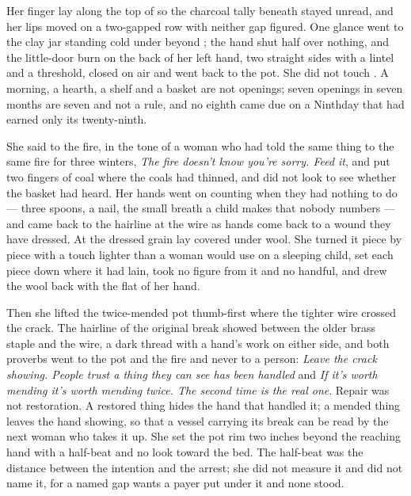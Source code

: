 Her finger lay along the top of  so the charcoal tally beneath stayed unread, and her lips moved on a two-gapped row with neither gap figured. One glance went to the clay jar standing cold under  beyond ; the hand shut half over nothing, and the little-door burn on the back of her left hand, two straight sides with a lintel and a threshold, closed on air and went back to the pot. She did not touch . A morning, a hearth, a shelf and a basket are not openings; seven openings in seven months are seven and not a rule, and no eighth came due on a Ninthday that had earned only its twenty-ninth.

She said to the fire, in the tone of a woman who had told the same thing to the same fire for three winters, \emph{The fire doesn't know you're sorry. Feed it}, and put two fingers of coal where the coals had thinned, and did not look to see whether the basket had heard. Her hands went on counting when they had nothing to do --- three spoons, a nail, the small breath a child makes that nobody numbers --- and came back to the hairline at the wire as hands come back to a wound they have dressed. At  the dressed grain lay covered under wool. She turned it piece by piece with a touch lighter than a woman would use on a sleeping child, set each piece down where it had lain, took no figure from it and no handful, and drew the wool back with the flat of her hand.

Then she lifted the twice-mended pot thumb-first where the tighter wire crossed the crack. The hairline of the original break showed between the older brass staple and the wire, a dark thread with a hand's work on either side, and both proverbs went to the pot and the fire and never to a person: \emph{Leave the crack showing. People trust a thing they can see has been handled} and \emph{If it's worth mending it's worth mending twice. The second time is the real one}. Repair was not restoration. A restored thing hides the hand that handled it; a mended thing leaves the hand showing, so that a vessel carrying its break can be read by the next woman who takes it up. She set the pot rim two inches beyond the reaching hand with a half-beat and no look toward the bed. The half-beat was the distance between the intention and the arrest; she did not measure it and did not name it, for a named gap wants a payer put under it and none stood.

